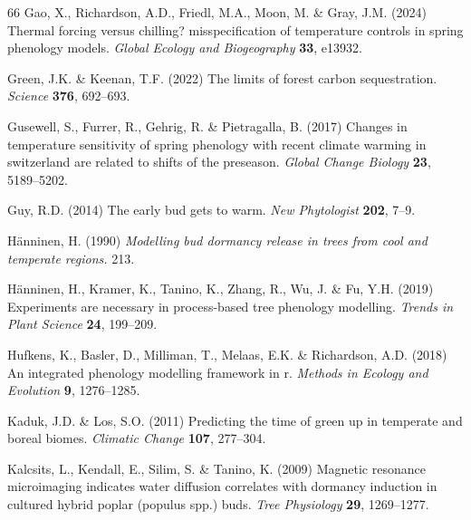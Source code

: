\documentclass[11pt]{article}
\begin{document}
\begin{thebibliography}{66}
Gao, X., Richardson, A.D., Friedl, M.A., Moon, M. \& Gray, J.M. (2024) Thermal
  forcing versus chilling? misspecification of temperature controls in spring
  phenology models. \emph{Global Ecology and Biogeography} \textbf{33}, e13932.

Green, J.K. \& Keenan, T.F. (2022) The limits of forest carbon sequestration.
  \emph{Science} \textbf{376}, 692--693.

Gusewell, S., Furrer, R., Gehrig, R. \& Pietragalla, B. (2017) Changes in
  temperature sensitivity of spring phenology with recent climate warming in
  switzerland are related to shifts of the preseason. \emph{Global Change
  Biology} \textbf{23}, 5189--5202.

Guy, R.D. (2014) The early bud gets to warm. \emph{New Phytologist}
  \textbf{202}, 7--9.

H{\"a}nninen, H. (1990) \emph{Modelling bud dormancy release in trees from cool
  and temperate regions.} 213.

H{\"a}nninen, H., Kramer, K., Tanino, K., Zhang, R., Wu, J. \& Fu, Y.H. (2019)
  Experiments are necessary in process-based tree phenology modelling.
  \emph{Trends in Plant Science} \textbf{24}, 199--209.

Hufkens, K., Basler, D., Milliman, T., Melaas, E.K. \& Richardson, A.D. (2018)
  An integrated phenology modelling framework in r. \emph{Methods in Ecology
  and Evolution} \textbf{9}, 1276--1285.

Kaduk, J.D. \& Los, S.O. (2011) Predicting the time of green up in temperate
  and boreal biomes. \emph{Climatic Change} \textbf{107}, 277--304.

Kalcsits, L., Kendall, E., Silim, S. \& Tanino, K. (2009) Magnetic resonance
  microimaging indicates water diffusion correlates with dormancy induction in
  cultured hybrid poplar (populus spp.) buds. \emph{Tree Physiology}
  \textbf{29}, 1269--1277.


\end{thebibliography}
\end{document}
